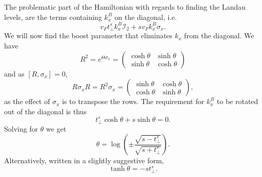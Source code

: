 The problematic part of the Hamiltonian with regards to finding the Landau levels, are the terms containing \(k^B_{x}\) on the diagonal, i.e.
\[
  v_F t^s_{\perp} k^B_{x} \mathcal{I}_{2} + s v_{F} k^B_{x} \sigma _{x}.
\]
We will now find the boost parameter that eliminates \(k_{x}\) from the diagonal.
We have
\begin{equation}
  \label{eq:20}
  R^{2} = e^{\Theta \sigma _{x} } =
  \begin{pmatrix}
    \cosh \theta & \sinh \theta \\
    \sinh \theta & \cosh \theta
  \end{pmatrix}
\end{equation}
and as $[R, \sigma_{x}] = 0$,
\begin{equation}
  \label{eq:21}
  R \sigma _{x} R =  R^{2} \sigma _{x} =
  \begin{pmatrix}
    \sinh \theta & \cosh \theta \\
    \cosh \theta & \sinh \theta
  \end{pmatrix},
\end{equation}
as the effect of \(\sigma _{x}\) is to transpose the rows.
The requirement for \(k^B_{x}\) to be rotated out of the diagonal is thus
\begin{equation}
  \label{eq:22}
  t^s_{\perp} \cosh \theta + s \sinh \theta = 0.
\end{equation}
Solving for \(\theta \) we get
\begin{equation}
  \label{eq:23}
  \theta = \log (
  \pm \frac{\sqrt{s - t^s_{\perp}}}{\sqrt{s + t^s_{\perp}}}
  ).
\end{equation}
Alternatively, written in a slightly suggestive form,
\begin{equation}
  \label{eq:24}
  \tanh \theta =
  - s t^s_{\perp}.
\end{equation}

